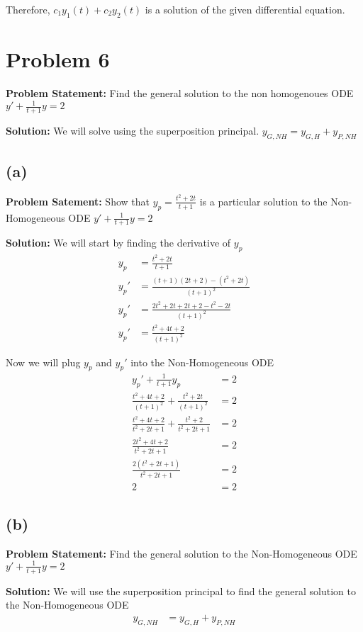 \documentclass[12pt, letterpaper]{article}
\begin{document}
Therefore, $c_1y_1(t) + c_2y_2(t)$ is a solution of the given differential equation.

\section*{Problem 6}
\textbf{Problem Statement:} Find the general solution to the non homogenoues ODE $y' + \frac{1}{t+1}y = 2$

\textbf{Solution:} We will solve using the superposition principal. $y_{G,NH} = y_{G,H} + y_{P,NH}$
\subsection*{(a)}
\textbf{Problem Satement:} Show that $y_p = \frac{t^2 + 2t}{t+1}$ is a particular solution to the Non-Homogeneous ODE $y' + \frac{1}{t+1}y = 2$

\textbf{Solution:} We will start by finding the derivative of $y_p$
\begin{align*}
y_p &= \frac{t^2 + 2t}{t+1} \\
y_p' &= \frac{(t+1)(2t+2) - (t^2 + 2t)}{(t+1)^2} \\
y_p' &= \frac{2t^2 + 2t + 2t + 2 - t^2 - 2t}{(t+1)^2} \\
y_p' &= \frac{t^2 + 4t + 2}{(t+1)^2}
\end{align*}

Now we will plug $y_p$ and $y_p'$ into the Non-Homogeneous ODE
\begin{align*}
y_p' + \frac{1}{t+1}y_p &= 2 \\
\frac{t^2 + 4t + 2}{(t+1)^2} + \frac{t^2 + 2t}{(t+1)^2} &= 2 \\
\frac{t^2 + 4t + 2 }{t^2 + 2t + 1} + \frac{t^2+2}{t^2 + 2t + 1} &= 2 \\
\frac{2t^2 + 4t + 2}{t^2 + 2t + 1} &= 2 \\
\frac{2(t^2 + 2t + 1)}{t^2 + 2t + 1} &= 2 \\
2 &= 2
\end{align*}

\subsection*{(b)}
\textbf{Problem Statement:} Find the general solution to the Non-Homogeneous ODE $y' + \frac{1}{t+1}y = 2$

\textbf{Solution:} We will use the superposition principal to find the general solution to the Non-Homogeneous ODE
\begin{align*}
y_{G,NH} &= y_{G,H} + y_{P,NH} \\
\end{align*}
\end{document}
